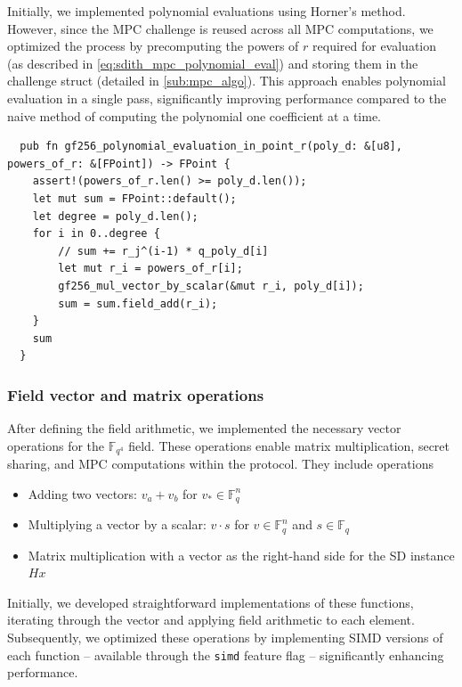 \documentclass[11pt]{report}
\theoremstyle{definition}
\theoremstyle{plain}
\begin{document}
Initially, we implemented polynomial evaluations using Horner's method. However, since the MPC challenge is reused across all MPC computations, we optimized the process by precomputing the powers of $r$ required for evaluation (as described in \autoref{eq:sdith_mpc_polynomial_eval}) and storing them in the challenge struct (detailed in \autoref{sub:mpc_algo}). This approach enables polynomial evaluation in a single pass, significantly improving performance compared to the naive method of computing the polynomial one coefficient at a time.

\begin{verbatim}
  pub fn gf256_polynomial_evaluation_in_point_r(poly_d: &[u8], powers_of_r: &[FPoint]) -> FPoint {
    assert!(powers_of_r.len() >= poly_d.len());
    let mut sum = FPoint::default();
    let degree = poly_d.len();
    for i in 0..degree {
        // sum += r_j^(i-1) * q_poly_d[i]
        let mut r_i = powers_of_r[i];
        gf256_mul_vector_by_scalar(&mut r_i, poly_d[i]);
        sum = sum.field_add(r_i);
    }
    sum
  }
\end{verbatim}

\subsubsection{Field vector and matrix operations}\label{sub:field_vector_operations}

After defining the field arithmetic, we implemented the necessary vector operations for the $\mathbb{F}_{q^4}$ field. These operations enable matrix multiplication, secret sharing, and MPC computations within the protocol. They include operations

\begin{itemize}
  \item Adding two vectors: $v_a + v_b$ for $v_* \in \mathbb{F}_{q}^n$
  \item Multiplying a vector by a scalar: $v \cdot s$ for $v \in \mathbb{F}_{q}^n$ and $s \in \mathbb{F}_{q}$
  \item Matrix multiplication with a vector as the right-hand side for the SD instance $Hx$
\end{itemize}

Initially, we developed straightforward implementations of these functions, iterating through the vector and applying field arithmetic to each element. Subsequently, we optimized these operations by implementing SIMD versions of each function -- available through the \texttt{simd} feature flag -- significantly enhancing performance.
\end{document}
